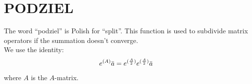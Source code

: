 \section{PODZIEL}
\label{sect:podziel}

\noindent The word ``podziel'' is Polish for ``split''. This function is
used to subdivide matrix operators if the summation doesn't converge.\\

\noindent We use the identity:\\

\begin{equation}
e^{(A)} \bar{a} = e^{({A \over 2})} e^{({A \over 2})} \bar{a}
\end{equation}

\noindent where $A$ is the $A$-matrix.\\
